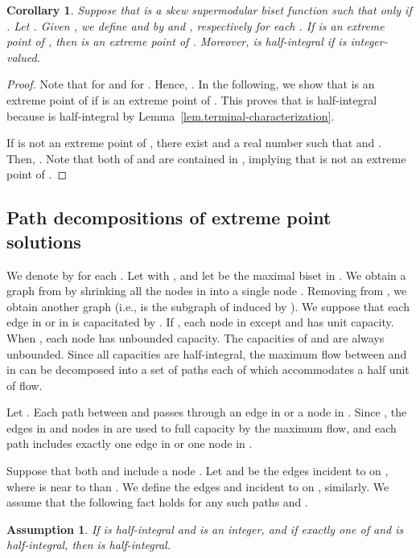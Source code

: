 \documentclass{article}
\newtheorem{corollary}{Corollary}
\newtheorem{assumption}{Assumption}
\begin{document}
\begin{corollary}\label{cor.half-integrality}
Suppose that  is a skew supermodular biset function such that  
only if . Let .
Given , we define 
 and  
by  
and , respectively for each .
If  is an extreme point of ,
then  is an extreme point of .
Moreover,  is half-integral if  is integer-valued.
\end{corollary}
\begin{proof}
Note that  for 
and 
for .
Hence, .
In the following, we show that  is an extreme point of 
if  is an extreme point of .
This proves that  is half-integral because
 is half-integral by Lemma~\ref{lem.terminal-characterization}.

If  is not an extreme point of 
, there exist  
and a real number 
such that  and .
Then, .
Note that both of  and  are contained in ,
implying that  is not an extreme point of .
\end{proof}

\subsection{Path decompositions of extreme point solutions} 
\label{subsec.path-decomp}

We denote  by  for each .
Let  with ,
and let  be the maximal biset in . 
We obtain a graph  
from  by shrinking all the nodes in  into a single node .
Removing  from ,
we obtain another graph 
(i.e.,  is the subgraph of  induced by ).
We suppose that each edge  in 
 or in  is capacitated by .
If , 
each node  in  except  and  has
unit capacity. When ,
each node has unbounded capacity.
The capacities of  and  are always unbounded.
Since all capacities are half-integral, the maximum flow 
between  and  in 
can be decomposed into a set of paths 
 each of which accommodates a half unit of flow. 

Let .
Each path between  and  
passes through an edge in  or a node in .
Since , the edges in  
and nodes in  are used to full capacity by the maximum flow,
and each path  includes exactly one edge in 
or one node in .


Suppose that both  and  include a node .
Let  and  be the edges incident to  on , where
 is near to  than .
We define the edges  and  incident to  on , similarly.
We assume that the following fact holds for any such paths  and .

  \begin{assumption}
   \label{assump:stay-half}
   If  is half-integral and  is an integer,
   and if exactly one of  and  is half-integral,
   then  is half-integral.
  \end{assumption}
\end{document}
